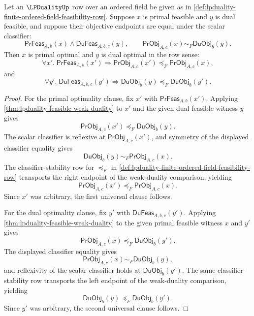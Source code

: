 \begin{corollary}
\label{cor:lpduality-weak-duality-equality-optimality}
Let an $\LPDualityUp$ row over an ordered field be given as in \autoref{def:lpduality-finite-ordered-field-feasibility-row}. Suppose $x$ is primal feasible and $y$ is dual feasible, and suppose their objective endpoints are equal under the scalar classifier:
$$
\mathsf{PrFeas}_{A,b}(x)\land\mathsf{DuFeas}_{A,b,c}(y),
\qquad
\mathsf{PrObj}_{A,c}(x)\sim_F\mathsf{DuObj}_{b}(y).
$$
Then $x$ is primal optimal and $y$ is dual optimal in the row sense:
$$
\forall x'.\;\mathsf{PrFeas}_{A,b}(x')
\Longrightarrow
\mathsf{PrObj}_{A,c}(x')\preceq_F\mathsf{PrObj}_{A,c}(x),
$$
and
$$
\forall y'.\;\mathsf{DuFeas}_{A,b,c}(y')
\Longrightarrow
\mathsf{DuObj}_{b}(y)\preceq_F\mathsf{DuObj}_{b}(y').
$$
\end{corollary}
\begin{proof}
For the primal optimality clause, fix $x'$ with $\mathsf{PrFeas}_{A,b}(x')$. Applying \autoref{thm:lpduality-feasible-weak-duality} to $x'$ and the given dual feasible witness $y$ gives
$$
\mathsf{PrObj}_{A,c}(x')\preceq_F\mathsf{DuObj}_{b}(y).
$$
The scalar classifier is reflexive at $\mathsf{PrObj}_{A,c}(x')$, and symmetry of the displayed classifier equality gives
$$
\mathsf{DuObj}_{b}(y)\sim_F\mathsf{PrObj}_{A,c}(x).
$$
The classifier-stability row for $\preceq_F$ in \autoref{def:lpduality-finite-ordered-field-feasibility-row} transports the right endpoint of the weak-duality comparison, yielding
$$
\mathsf{PrObj}_{A,c}(x')\preceq_F\mathsf{PrObj}_{A,c}(x).
$$
Since $x'$ was arbitrary, the first universal clause follows.

For the dual optimality clause, fix $y'$ with $\mathsf{DuFeas}_{A,b,c}(y')$. Applying \autoref{thm:lpduality-feasible-weak-duality} to the given primal feasible witness $x$ and $y'$ gives
$$
\mathsf{PrObj}_{A,c}(x)\preceq_F\mathsf{DuObj}_{b}(y').
$$
The displayed classifier equality gives
$$
\mathsf{PrObj}_{A,c}(x)\sim_F\mathsf{DuObj}_{b}(y),
$$
and reflexivity of the scalar classifier holds at $\mathsf{DuObj}_{b}(y')$. The same classifier-stability row transports the left endpoint of the weak-duality comparison, yielding
$$
\mathsf{DuObj}_{b}(y)\preceq_F\mathsf{DuObj}_{b}(y').
$$
Since $y'$ was arbitrary, the second universal clause follows.
\end{proof}

